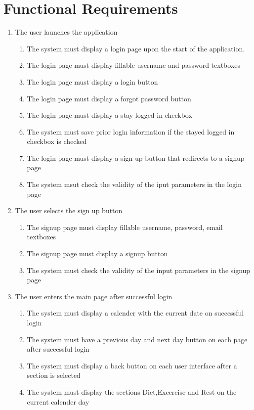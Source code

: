 \documentclass[12pt,letterpaper]{article}
\begin{document}
\section{Functional Requirements}
\begin{enumerate}[{BE}1.] 
\item The user launches the application
\begin{enumerate}[{FR}1.]
	\item  The system must display a login page upon the start of the application.
	\item  The login page must display fillable username and password  textboxes
	\item  The login page must display a login button
	\item  The login page must display a forgot password button
	\item  The login page must display a stay logged in checkbox
	\item  The system must save prior login information if the stayed logged in checkbox is checked
	\item  The login page must display a sign up button that redirects to a signup page
	\item  The system msut check the validity of the iput parameters in the login page
\end{enumerate}

\item The user selects the sign up button
\begin{enumerate}[resume*]
	\item  The signup page must display fillable username, password, email textboxes
	\item  The signup page must display a signup button
	\item  The system must check the validity of the input parameters in the signup page
\end{enumerate}

\item The user enters the main page after successful login
\begin{enumerate}[resume*]
	\item  The system must display a calender with the current date on successful login
	\item  The system must have a previous day and next day button on each page after successful login
	\item  The system must display a back button on each user interface after a section is selected
	\item  The system must display the sections Diet,Excercise and Rest on the current calender day
\end{enumerate}


\end{enumerate}
\end{document}
